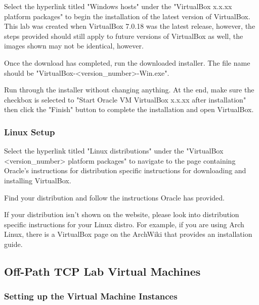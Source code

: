 \documentclass[letterpaper,12pt]{report}
\begin{document}
Select the hyperlink titled "Windows hosts" under the "VirtualBox x.x.xx platform packages" to begin the installation of the latest version of VirtualBox. This lab was created when VirtualBox 7.0.18 was the latest release, however, the steps provided should still apply to future versions of VirtualBox as well, the images shown may not be identical, however.

Once the download has completed, run the downloaded installer. The file name should be "VirtualBox-<version\_number>-Win.exe".

Run through the installer without changing anything. At the end, make sure the checkbox is selected to "Start Oracle VM VirtualBox x.x.xx after installation" then click the "Finish" button to complete the installation and open VirtualBox.

\subsubsection*{Linux Setup}\label{sec:Virtual-Machine-Linux-Setup}

Select the hyperlink titled "Linux distributions" under the "VirtualBox <version\_number> platform packages" to navigate to the page containing Oracle's instructions for distribution specific instructions for downloading and installing VirtualBox.

Find your distribution and follow the instructions Oracle has provided.

If your distribution isn't shown on the website, please look into distribution specific instructions for your Linux distro. For example, if you are using Arch Linux, there is a VirtualBox page on the ArchWiki that provides an installation guide.

\subsection*{Off-Path TCP Lab Virtual Machines}\label{sec:Off-Path-TCP-Lab-Virtual-Machines}

\subsubsection*{Setting up the Virtual Machine Instances}\label{sec:Setting-up-the-Virtual-Machine-Instances}
\end{document}

